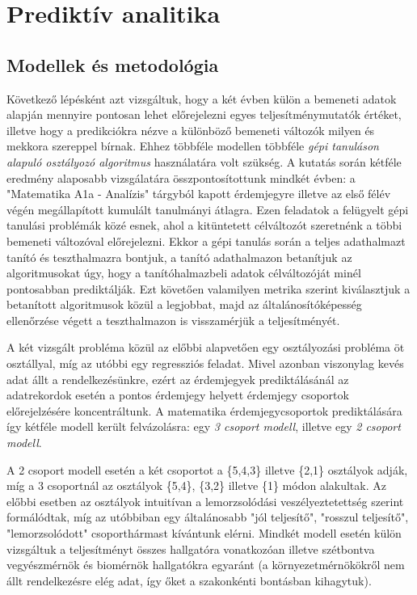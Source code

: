 \documentclass[12pt]{article}
\begin{document}
\section{Prediktív analitika}

\subsection{Modellek és metodológia}

Következő lépésként azt vizsgáltuk, hogy a két évben külön a bemeneti adatok alapján mennyire pontosan lehet előrejelezni egyes teljesítménymutatók értéket, illetve hogy a predikciókra nézve a különböző bemeneti változók milyen és mekkora szereppel bírnak. Ehhez többféle modellen többféle \textit{gépi tanuláson alapuló osztályozó algoritmus} használatára volt szükség. A kutatás során kétféle eredmény alaposabb vizsgálatára összpontosítottunk mindkét évben: a "Matematika A1a - Analízis" tárgyból kapott érdemjegyre illetve az első félév végén megállapított kumulált tanulmányi átlagra. Ezen feladatok a felügyelt gépi tanulási problémák közé esnek, ahol a kitüntetett célváltozót szeretnénk a többi bemeneti változóval előrejelezni. Ekkor a gépi tanulás során a teljes adathalmazt tanító és teszthalmazra bontjuk, a tanító adathalmazon betanítjuk az algoritmusokat úgy, hogy a tanítóhalmazbeli adatok célváltozóját minél pontosabban prediktálják. Ezt követően valamilyen metrika szerint kiválasztjuk a betanított algoritmusok közül a legjobbat, majd az általánosítóképesség ellenőrzése végett a teszthalmazon is visszamérjük a teljesítményét.


A két vizsgált probléma közül az előbbi alapvetően egy osztályozási probléma öt osztállyal, míg az utóbbi egy regressziós feladat. Mivel azonban viszonylag kevés adat állt a rendelkezésünkre, ezért az érdemjegyek prediktálásánál az adatrekordok esetén a pontos érdemjegy helyett érdemjegy csoportok előrejelzésére koncentráltunk. A matematika érdemjegycsoportok prediktálására így kétféle modell került felvázolásra: egy \textit{3 csoport modell}, illetve egy \textit{2 csoport modell}.

A 2 csoport modell esetén a két csoportot a \{5,4,3\} illetve \{2,1\} osztályok adják, míg a 3 csoportnál az osztályok \{5,4\}, \{3,2\} illetve \{1\} módon alakultak. Az előbbi esetben az osztályok intuitívan a lemorzsolódási veszélyeztetettség szerint formálódtak, míg az utóbbiban egy általánosabb "jól teljesítő", "rosszul teljesítő", "lemorzsolódott" csoporthármast kívántunk elérni. Mindkét modell esetén külön vizsgáltuk a teljesítményt összes hallgatóra vonatkozóan illetve szétbontva vegyészmérnök és biomérnök hallgatókra egyaránt (a környezetmérnökökről nem állt rendelkezésre elég adat, így őket a szakonkénti bontásban kihagytuk).
\end{document}
